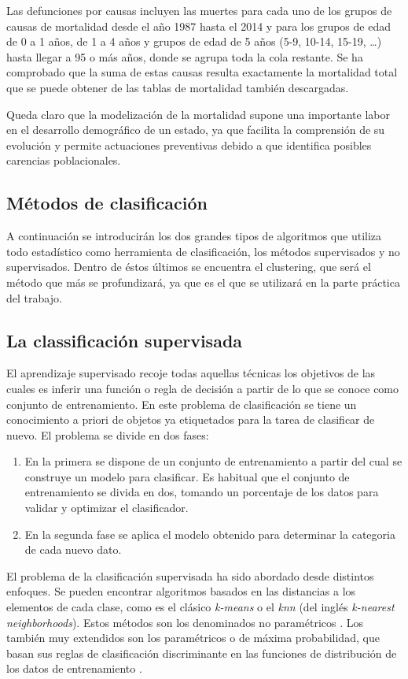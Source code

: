 \documentclass{article}
\begin{document}
Las defunciones por causas incluyen las muertes para cada uno de los grupos de causas de mortalidad desde el año 1987 hasta el 2014 y para los grupos de edad de 0 a 1 años, de 1 a 4 años y grupos de edad de 5 años (5-9, 10-14, 15-19, \dots) hasta llegar a 95 o más años, donde se agrupa toda la cola restante. Se ha comprobado que la suma de estas causas resulta exactamente la mortalidad total que se puede obtener de las tablas de mortalidad también descargadas. 


Queda claro que la modelización de la mortalidad supone una importante labor en el desarrollo demográfico de un estado, ya que facilita la comprensión de su evolución y permite actuaciones preventivas debido a que identifica posibles carencias poblacionales.

\subsection{Métodos de clasificación}
A continuación se introducirán los dos grandes tipos de algoritmos que utiliza todo estadístico como herramienta de clasificación, los métodos supervisados y no supervisados. Dentro de éstos últimos se encuentra el clustering, que será el método que más se profundizará, ya que es el que se utilizará en la parte práctica del trabajo.

\subsection*{La classificación supervisada}
El aprendizaje supervisado recoje todas aquellas técnicas los objetivos de las cuales es inferir una función o regla de decisión a partir de lo que se conoce como conjunto de entrenamiento. En este problema de clasificación se tiene un conocimiento a priori de objetos ya etiquetados para la tarea de clasificar de nuevo.
El problema se divide en dos fases:
\begin{enumerate}
\item En la primera se dispone de un conjunto de entrenamiento a partir del cual se construye un modelo para clasificar. Es habitual que el conjunto de entrenamiento se divida en dos, tomando un porcentaje de los datos para validar y optimizar el clasificador.
\item En la segunda fase se aplica el modelo obtenido para determinar la categoria de cada nuevo dato.
\end{enumerate}

El problema de la clasificación supervisada ha sido abordado desde distintos enfoques. Se pueden encontrar algoritmos basados en las distancias a los elementos de cada clase, como es el clásico \emph{k-means} o el \emph{knn} (del inglés \emph{k-nearest neighborhoods}). Estos métodos son los denominados no paramétricos \cite{coha}. Los también muy extendidos son los paramétricos o de máxima probabilidad, que basan sus reglas de clasificación discriminante en las funciones de distribución de los datos de entrenamiento \cite{deki}.
\end{document}
